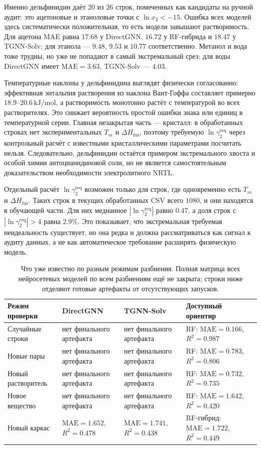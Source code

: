 \documentclass[11pt]{article}
\newcommand{\mae}{\mathrm{MAE}}
\newcommand{\Rtwo}{R^2}
\theoremstyle{definition}
\begin{document}
Именно дельфинидин даёт $20$ из $26$ строк, помеченных как кандидаты на ручной аудит: это ацетоновые и этаноловые точки с $\ln x_2<-15$. Ошибка всех моделей здесь систематически положительная, то есть модели завышают растворимость. Для ацетона MAE равна $17.68$ у DirectGNN, $16.72$ у RF-гибрида и $18.47$ у TGNN-Solv; для этанола --- $9.48$, $9.53$ и $10.77$ соответственно. Метанол и вода тоже трудны, но уже не попадают в самый экстремальный срез: для воды DirectGNN имеет $\mae=3.63$, TGNN-Solv --- $4.03$.

Температурные наклоны у дельфинидина выглядят физически согласованно: эффективная энтальпия растворения из наклона Вант-Гоффа составляет примерно $18.9$--$20.6\,\mathrm{kJ/mol}$, а растворимость монотонно растёт с температурой во всех растворителях. Это снижает вероятность простой ошибки знака или единиц в температурной серии. Главная незакрытая часть --- кристалл: в обработанных строках нет экспериментальных $T_m$ и $\Delta H_{\mathrm{fus}}$, поэтому требуемую $\ln\gamma_2^{\mathrm{req}}$ через контрольный расчёт с известными кристаллическими параметрами посчитать нельзя. Следовательно, дельфинидин остаётся примером экстремального хвоста и особой химии антоцианидиновой соли, но не является самостоятельным доказательством необходимости электролитного NRTL.

Отдельный расчёт $\ln\gamma_2^{\mathrm{req}}$ возможен только для строк, где одновременно есть $T_m$ и $\Delta H_{\mathrm{fus}}$. Таких строк в текущих обработанных CSV всего $1080$, и они находятся в обучающей части. Для них медианное $|\ln\gamma_2^{\mathrm{req}}|$ равно $0.47$, а доля строк с $|\ln\gamma_2^{\mathrm{req}}|>4$ равна $2.9\%$. Это показывает, что экстремальная требуемая неидеальность существует, но она редка и должна рассматриваться как сигнал к аудиту данных, а не как автоматическое требование расширять физическую модель.

\begin{table}[H]
\centering
\caption{Что уже известно по разным режимам разбиения. Полная матрица всех нейросетевых моделей по всем разбиениям ещё не закрыта; строки ниже отделяют готовые артефакты от отсутствующих запусков.}
\label{tab:split-wise-current}
\small
\begin{tabularx}{\textwidth}{P{0.24\textwidth}P{0.21\textwidth}P{0.21\textwidth}Y}
\toprule
Режим проверки & DirectGNN & TGNN-Solv & Доступный ориентир \\
\midrule
Случайные строки & нет финального артефакта & нет финального артефакта & RF: $\mae=0.166$, $\Rtwo=0.987$ \\
Новые пары & нет финального артефакта & нет финального артефакта & RF: $\mae=0.783$, $\Rtwo=0.806$ \\
Новый растворитель & нет финального артефакта & нет финального артефакта & RF: $\mae=0.732$, $\Rtwo=0.735$ \\
Новое вещество & нет финального артефакта & нет финального артефакта & RF: $\mae=1.642$, $\Rtwo=0.420$ \\
Новый каркас & $\mae=1.652$, $\Rtwo=0.478$ & $\mae=1.741$, $\Rtwo=0.438$ & RF-гибрид: $\mae=1.722$, $\Rtwo=0.449$ \\
\bottomrule
\end{tabularx}
\end{table}
\end{document}
